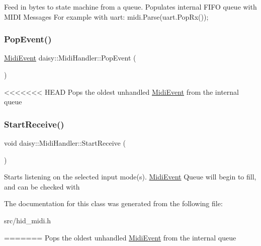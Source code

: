 Feed in bytes to state machine from a queue. Populates internal F\+I\+FO queue with M\+I\+DI Messages For example with uart\+: midi.\+Parse(uart.\+Pop\+Rx()); \mbox{\label{classdaisy_1_1_midi_handler_a1d88de50782d9b561b1862e3dd5ca566}} 
\subsubsection{\texorpdfstring{Pop\+Event()}{PopEvent()}}
{\footnotesize\ttfamily \hyperlink{structdaisy_1_1_midi_event}{Midi\+Event} daisy\+::\+Midi\+Handler\+::\+Pop\+Event (\begin{DoxyParamCaption}{ }\end{DoxyParamCaption})\hspace{0.3cm}{\ttfamily [inline]}}

<<<<<<< HEAD
Pops the oldest unhandled \hyperlink{structdaisy_1_1_midi_event}{Midi\+Event} from the internal queue \mbox{\label{classdaisy_1_1_midi_handler_aec305ba283ba3efdc0e95c822e87040b}} 
\subsubsection{\texorpdfstring{Start\+Receive()}{StartReceive()}}
{\footnotesize\ttfamily void daisy\+::\+Midi\+Handler\+::\+Start\+Receive (\begin{DoxyParamCaption}{ }\end{DoxyParamCaption})}

Starts listening on the selected input mode(s). \hyperlink{structdaisy_1_1_midi_event}{Midi\+Event} Queue will begin to fill, and can be checked with 

The documentation for this class was generated from the following file\+:\begin{DoxyCompactItemize}
\item 
src/hid\+\_\+midi.\+h\end{DoxyCompactItemize}
=======
Pops the oldest unhandled \hyperlink{structdaisy_1_1_midi_event}{Midi\+Event} from the internal queue \mbox{\label{classdaisy_1_1_midi_handler_a8e76d18b87a9578f7c47975fd2cd172a}} 
